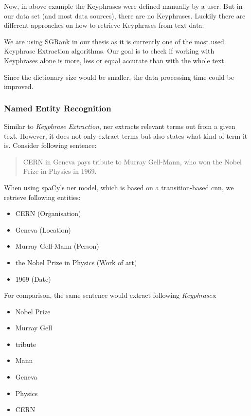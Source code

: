 Now, in above example the Keyphrases were defined manually by a user.
But in our data set (and most data sources), there are no Keyphrases.
Luckily there are different approaches on how to retrieve Keyphrases from text data.

We are using SGRank\cite{SGRank} in our thesis as it is currently one of the most used
Keyphrase Extraction algorithms.
Our goal is to check if working with Keyphrases alone is more, less or equal accurate
than with the whole text.

Since the dictionary size would be smaller, the data processing time could be improved.

\subsubsection{Named Entity Recognition}
\label{subsubsec:3_named_entity_recognition}

Similar to \textit{Keyphrase Extraction}, \Gls{ner} extracts relevant terms out from a given text.
However, it does not only extract terms but also states what kind of term it is.
Consider following sentence:

\begin{quotation}
    CERN in Geneva pays tribute to Murray Gell-Mann, who won the Nobel Prize in Physics in 1969.
\end{quotation}

When using spaCy's \gls{ner} model, which is based on a transition-based \gls{cnn}\cite{LampleBSKD16},
we retrieve following entities:

\begin{itemize}
    \item CERN (Organisation)
    \item Geneva (Location)
    \item Murray Gell-Mann (Person)
    \item the Nobel Prize in Physics (Work of art)
    \item 1969 (Date)
\end{itemize}

For comparison, the same sentence would extract following \textit{Keyphrases}:

\begin{itemize}
    \item Nobel Prize
    \item Murray Gell
    \item tribute
    \item Mann
    \item Geneva
    \item Physics
    \item CERN
\end{itemize}

